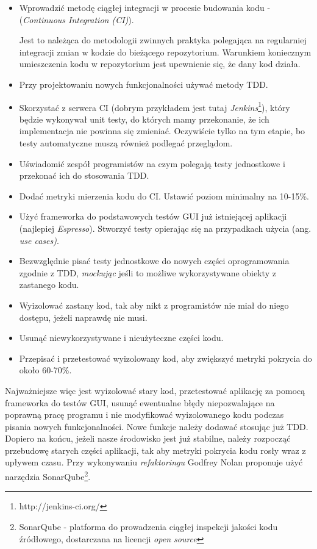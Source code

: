 \begin{itemize}
\item 
Wprowadzić metodę ciągłej integracji w procesie budowania kodu -  (\textit{Continuous Integration (CI)}).

Jest to należąca do metodologii zwinnych praktyka polegająca na regularniej integracji zmian w kodzie do bieżącego repozytorium. Warunkiem koniecznym umieszczenia kodu w repozytorium jest upewnienie się, że dany kod działa.

\item
Przy projektowaniu nowych funkcjonalności używać metody TDD.

\item
Skorzystać z serwera CI (dobrym przykładem jest tutaj \textit{Jenkins}\footnote{http://jenkins-ci.org/}), który będzie wykonywał unit testy, do których mamy przekonanie, że ich implementacja nie powinna się zmieniać. Oczywiście tylko na tym etapie, bo testy automatyczne muszą również podlegać przeglądom.

\item
Uświadomić zespół programistów na czym polegają testy jednostkowe i przekonać ich do stosowania TDD.

\item
Dodać metryki mierzenia kodu do CI. Ustawić poziom minimalny na 10-15\%.

\item
Użyć frameworka do podstawowych testów GUI już istniejącej aplikacji (najlepiej \textit{Espresso}). Stworzyć testy opierając się na przypadkach użycia (ang. \textit{use cases)}.

\item
Bezwzględnie pisać testy jednostkowe do nowych części oprogramowania zgodnie z TDD, \textit{mockując} jeśli to możliwe wykorzystywane obiekty z zastanego kodu.

\item
Wyizolować zastany kod, tak aby nikt z programistów nie miał do niego dostępu, jeżeli naprawdę nie musi.

\item
Usunąć niewykorzystywane i nieużyteczne części kodu.

\item
Przepisać i przetestować wyizolowany kod, aby zwiększyć metryki pokrycia do około 60-70\%. 
\end{itemize}

Najważniejsze więc jest wyizolować stary kod, przetestować aplikację za pomocą frameworka do testów GUI, usunąć ewentualne błędy niepozwalające na poprawną pracę programu i nie modyfikować wyizolowanego kodu podczas pisania nowych funkcjonalności. Nowe funkcje należy dodawać stosując już TDD. Dopiero na końcu, jeżeli nasze środowisko jest już stabilne, należy rozpocząć przebudowę starych części aplikacji, tak aby metryki pokrycia kodu rosły wraz z upływem czasu. Przy wykonywaniu \textit{refaktoringu} Godfrey Nolan proponuje użyć narzędzia SonarQube\footnote{SonarQube - platforma do prowadzenia ciągłej inspekcji jakości kodu źródłowego, dostarczana na licencji \textit{open source}}.